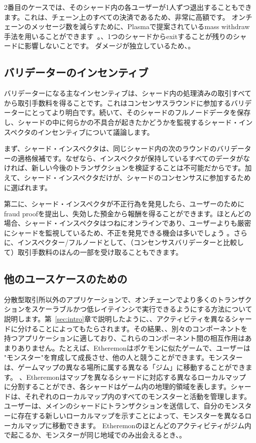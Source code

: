2番目のケースでは、そのシャード内の各ユーザーが1人ずつ退出することもできます。これは、チェーン上のすべての決済であるため、非常に高額です。 オンチェーンのメッセージ数を減らすために、Plasmaで提案されているmass withdraw手法を用いることができます~\cite{plasma}。、1つのシャードからexitすることが残りのシャードに影響しないことです。 ダメージが独立しているため、。

\subsection{バリデーターのインセンティブ}
バリデーターになる主なインセンティブは、シャード内の処理済みの取引すべてから取引手数料を得ることです。これはコンセンサスラウンドに参加するバリデーターにとってより明白です。続いて、そのシャードのフルノードデータを保存し、シャードの中に何らかの不具合が起きたかどうかを監視するシャード・インスペクタのインセンティブについて議論します。

まず、シャード・インスペクタは、同じシャード内の次のラウンドのバリデーターの適格候補です。なぜなら、インスペクタが保持しているすべてのデータがなければ、新しい今後のトランザクションを検証することは不可能だからです。加えて、シャード・インスペクタだけが、シャードのコンセンサスに参加するために選ばれます。

第二に、シャード・インスペクタが不正行為を発見したら、ユーザーのためにfraud proofを提出し、失効した預金から報酬を得ることができます。ほとんどの場合、シャード・インスペクタはつねにオンラインであり、ユーザーよりも厳密にシャードを監視しているため、不正を発見できる機会は多いでしょう 。さらに、インスペクター/フルノードとして、（コンセンサスバリデーターと比較して）取引手数料のほんの一部を受け取ることもできます。

\subsection{他のユースケースのための\codename}
\label{sec:others}

分散型取引所以外のアプリケーションで、オンチェーンでより多くのトランザクションをスケーラブルかつ低レイテインシで実行できるようにする方法について説明します。第~\ref{sec:intro}章で説明したように、、アクティビティを異なるシャードに分けることによってもたらされます。その結果、、別々のコンポーネントを持つアプリケーションに適しており、これらのコンポーネント間の相互作用はあまりありません。たとえば、Etheremonはポケモンに似たゲームで、ユーザーは "モンスター"を育成して成長させ、他の人と競うことができます。モンスターは、ゲームマップの異なる場所に属する異なる「ジム」に移動することができます。 、Etheremonはマップを異なるシャードに対応する異なるローカルマップに分割することができ、各シャードはゲーム内の地理的領域を表します。シャードは、それぞれのローカルマップ内のすべてのモンスターと活動を管理します。ユーザーは、メインのシャードにトランザクションを送信して、自分のモンスターに存在する新しいローカルマップを示すことによって、モンスターを異なるローカルマップに移動できます。 Etheremonのほとんどのアクティビティがジム内で起こるか、モンスターが同じ地域でのみ出会えるとき、。

